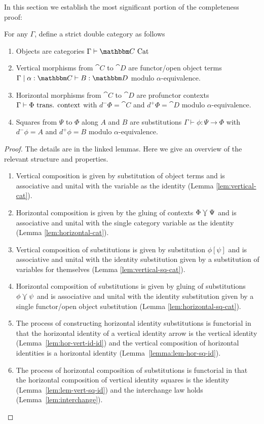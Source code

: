 \documentclass{llncs}
\begin{document}
In this section we establish the most significant portion of the
completeness proof:
\begin{construction}
  For any $\Gamma$, define a strict double category as follows
  \begin{enumerate}
  \item Objects are categories $\Gamma \vdash \cat C \isaCat$
  \item Vertical morphisms from $\cat C$ to $\cat D$ are functor/open
    object terms $\Gamma \pipe\alpha:\cat C \vdash B : \cat D$ modulo
    $\alpha$-equivalence.
  \item Horizontal morphisms from $\cat C$ to $\cat D$ are profunctor
    contexts $\Gamma\vdash \Phi \,\,\textrm{trans. context}$ with $d^-\Phi = \cat C$ and
    $d^+\Phi = \cat D$ modulo $\alpha$-equivalence.
  \item Squares from $\Psi$ to $\Phi$ along $A$ and $B$ are
    substitutions $\Gamma \vdash \phi : \Psi \to \Phi$ with $d^-\phi =
    A$ and $d^+\phi = B$ modulo $\alpha$-equivalence.
  \end{enumerate}
\end{construction}
\begin{proof}
  The details are in the linked lemmas. Here we give an overview of
  the relevant structure and properties.
  \begin{enumerate}
  \item Vertical composition is given by substitution of object terms
    and is associative and unital with the variable as the identity
    (Lemma \ref{lem:vertical-cat}).
  \item Horizontal composition is given by the gluing of contexts
    $\Phi\curlyveedownarrow \Psi$ and is associative and unital with the single
    category variable as the identity (Lemma
    \ref{lem:horizontal-cat}).
  \item Vertical composition of substitutions is given by substitution
    $\phi[\psi]$ and is associative and unital with the identity
    substitution given by a substitution of variables for themselves
    (Lemma \ref{lem:vertical-sq-cat}).
  \item Horizontal composition of substitutions is given by gluing of
    substitutions $\phi \curlyveedownarrow \psi$ and is associative and unital
    with the identity substitution given by a single functor/open
    object substitution (Lemma \ref{lem:horizontal-sq-cat}).
  \item The process of constructing horizontal identity substitutions
    is functorial in that the horizontal identity of a vertical
    identity arrow is the vertical identity
    (Lemma~\ref{lem:hor-vert-id-id}) and the vertical composition of
    horizontal identities is a horizontal identity
    (Lemma~\ref{lemma:lem-hor-sq-id}).
  \item The process of horizontal composition of substitutions is
    functorial in that the horizontal composition of vertical identity
    squares is the identity (Lemma~\ref{lem:lem-vert-sq-id}) and the
    interchange law holds (Lemma~\ref{lem:interchange}).
  \end{enumerate}
\end{proof}
\end{document}
